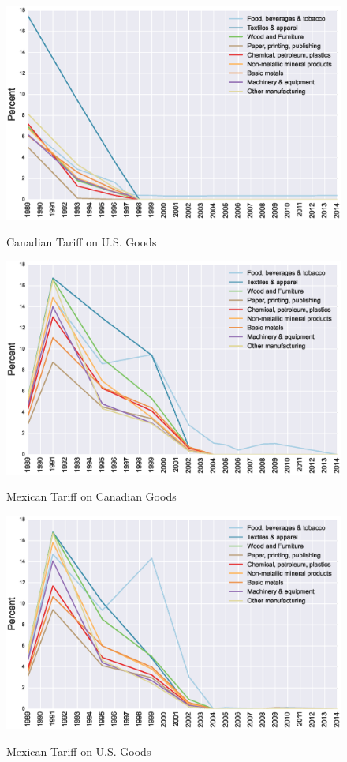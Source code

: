 \begin{figure}[htpb]\centering
\caption{Canadian Tariff on U.S. Goods}\vspace{0.2cm}
\includegraphics[scale=0.5]{tau_can_usa}
\label{fig:can_usa}
\end{figure}

\begin{figure}[htpb]\centering
\caption{\small Mexican Tariff on Canadian Goods}\vspace{0.2cm}
\includegraphics[scale=0.5]{tau_mex_can}
\label{fig:mex_can}
\end{figure}

\begin{figure}[htpb]\centering
\caption{\small Mexican Tariff on U.S. Goods}\vspace{0.2cm}
\includegraphics[scale=0.5]{tau_mex_usa}
\label{fig:mex_usa}
\end{figure}

